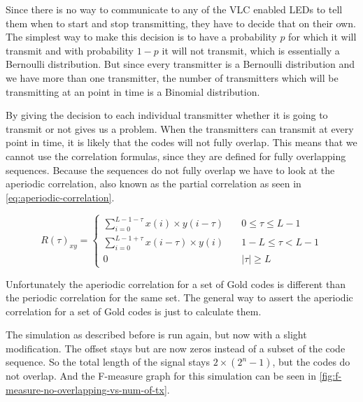 		Since there is no way to communicate to any of the VLC enabled LEDs to tell them when to start and stop transmitting, they have to decide that on their own. 
		The simplest way to make this decision is to have a probability $p$ for which it will transmit and with probability $1 - p$ it will not transmit, which is essentially a Bernoulli distribution.
		But since every transmitter is a Bernoulli distribution and we have more than one transmitter, the number of transmitters which will be transmitting at an point in time is a Binomial distribution.

		By giving the decision to each individual transmitter whether it is going to transmit or not gives us a problem.
		When the transmitters can transmit at every point in time, it is likely that the codes will not fully overlap.
		This means that we cannot use the correlation formulas, since they are defined for fully overlapping sequences.
		Because the sequences do not fully overlap we have to look at the aperiodic correlation, also known as the partial correlation as seen in \autoref{eq:aperiodic-correlation}.

		\begin{equation}
			R(\tau)_{xy} = 
				\begin{cases}
					\displaystyle\sum_{i = 0} ^ {L - 1 - \tau} x(i) \times y(i - \tau)		& \quad 0 \le \tau \le L - 1 \\
					\displaystyle\sum_{i = 0} ^ {L - 1 + \tau} x(i - \tau) \times y(i)		& \quad 1 - L \le \tau < L - 1 \\
					0																		& \quad  |\tau| \ge L
				\end{cases}
			\label{eq:aperiodic-correlation}
		\end{equation}

		Unfortunately the aperiodic correlation for a set of Gold codes is different than the periodic correlation for the same set.
		The general way to assert the aperiodic correlation for a set of Gold codes is just to calculate them.

		The simulation as described before is run again, but now with a slight modification.
		The offset stays but are now zeros instead of a subset of the code sequence.
		So the total length of the signal stays $2 \times (2^n - 1)$, but the codes do not overlap. 
		And the F-measure graph for this simulation can be seen in \autoref{fig:f-measure-no-overlapping-vs-num-of-tx}.


